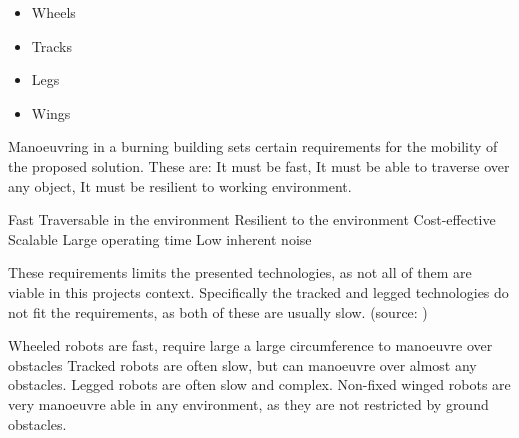 \begin{multicols}{4}
    \begin{itemize}
        \Centering
        \item Wheels
        \item Tracks
        \item Legs
        \item Wings
    \end{itemize}
\end{multicols}

Manoeuvring in a burning building sets certain requirements for the mobility of the proposed solution. These are: It must be fast, It must be able to traverse over any object, It must be resilient to working environment.

Fast
Traversable in the environment
Resilient to the environment
Cost-effective
Scalable
Large operating time
Low inherent noise



These requirements limits the presented technologies, as not all of them are viable in this projects context. Specifically the tracked and legged technologies do not fit the requirements, as both of these are usually slow. (source: ) 

Wheeled robots are fast, require large a large circumference to manoeuvre over obstacles
Tracked robots are often slow, but can manoeuvre over almost any obstacles.
Legged robots are often slow and complex.
Non-fixed winged robots are very manoeuvre able in any environment, as they are not restricted by ground obstacles. 

